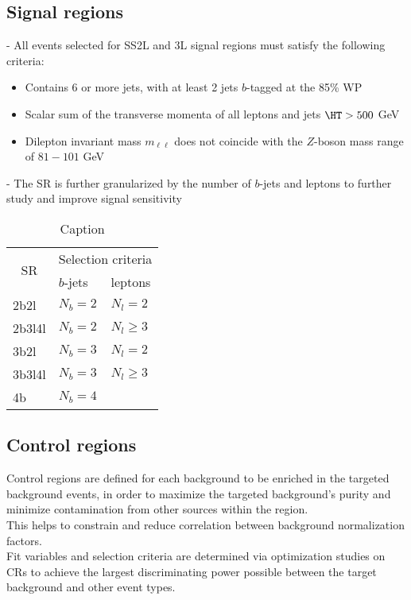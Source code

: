 \documentclass[../thesis.tex]{subfiles}
\begin{document}
\subsection{Signal regions}
- All events selected for SS2L and 3L signal regions must satisfy the following criteria:
\begin{itemize}
\item Contains 6 or more jets, with at least 2 jets $b$-tagged at the 85\% WP
\item Scalar sum of the transverse momenta of all leptons and jets $\HT > 500$ GeV
\item Dilepton invariant mass $m_{\ell\ell}$ does not coincide with the $Z$-boson mass range of $81-101$ GeV
\end{itemize}
- The SR is further granularized by the number of $b$-jets and leptons to further study and improve signal sensitivity\\

\begin{table}[!ht]
\centering
\caption{\label{tab:ana:SR}Caption}%
\begin{tabular}{p{2cm}|p{3cm}l}
\toprule\toprule
\multicolumn{1}{c|}{\multirow{ 2}{*}{SR}} & \multicolumn{2}{c}{Selection criteria} \\
\multicolumn{1}{c|}{}					  & $b$-jets	& leptons \\
\midrule
2b2l			& $N_b = 2$	& $N_l = 2$\\
2b3l4l			& $N_b = 2$	& $N_l \geq 3$\\
3b2l			& $N_b = 3$	& $N_l = 2$\\
3b3l4l			& $N_b = 3$	& $N_l \geq 3$\\
4b				& $N_b = 4$	& \\
\bottomrule\bottomrule
\end{tabular}
\end{table}

\subsection{Control regions}
Control regions are defined for each background to be enriched in the targeted background events, in order to maximize the targeted background's purity and minimize contamination from other sources within the region.\\
This helps to constrain and reduce correlation between background normalization factors.\\
Fit variables and selection criteria are determined via optimization studies on CRs to achieve the largest discriminating power possible between the target background and other event types.
\end{document}
